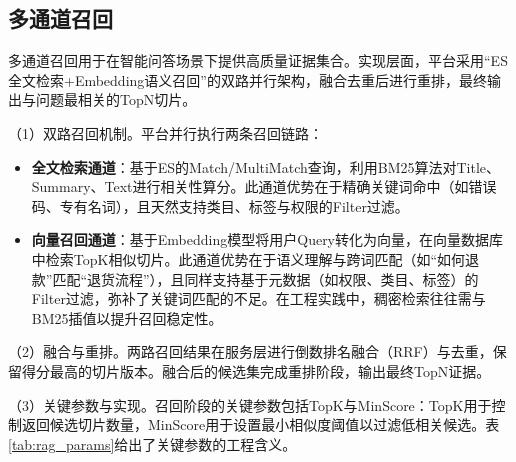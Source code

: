 

\subsection{多通道召回}
\label{subsec:impl_ca_search}

多通道召回用于在智能问答场景下提供高质量证据集合。实现层面，平台采用“ES全文检索+Embedding语义召回”的双路并行架构，融合去重后进行重排，最终输出与问题最相关的TopN切片。

（1）双路召回机制。平台并行执行两条召回链路：
\begin{itemize}
\item \textbf{全文检索通道}：基于ES的Match/MultiMatch查询，利用BM25算法对Title、Summary、Text进行相关性算分。此通道优势在于精确关键词命中（如错误码、专有名词），且天然支持类目、标签与权限的Filter过滤。
\item \textbf{向量召回通道}：基于Embedding模型将用户Query转化为向量，在向量数据库中检索TopK相似切片。此通道优势在于语义理解与跨词匹配（如“如何退款”匹配“退货流程”），且同样支持基于元数据（如权限、类目、标签）的Filter过滤，弥补了关键词匹配的不足。在工程实践中，稠密检索往往需与BM25插值以提升召回稳定性\cite{wang2021bert}。
\end{itemize}

（2）融合与重排。两路召回结果在服务层进行倒数排名融合（RRF）与去重，保留得分最高的切片版本。融合后的候选集完成重排阶段，输出最终TopN证据\cite{pradeep2022squeezing}。

（3）关键参数与实现。召回阶段的关键参数包括TopK与MinScore：TopK用于控制返回候选切片数量，MinScore用于设置最小相似度阈值以过滤低相关候选。表\ref{tab:rag_params}给出了关键参数的工程含义。

